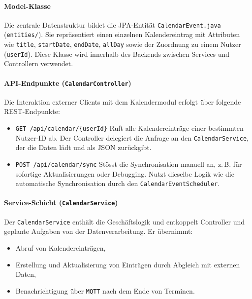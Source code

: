 \documentclass[12pt,a4paper]{report}
\begin{document}
\paragraph{Model-Klasse}
    Die zentrale Datenstruktur bildet die JPA-Entität \texttt{CalendarEvent.java} (\texttt{entities/}).
    Sie repräsentiert einen einzelnen Kalendereintrag mit Attributen wie \texttt{title}, \texttt{startDate}, \texttt{endDate}, \texttt{allDay} sowie der Zuordnung zu einem Nutzer (\texttt{userId}).
    Diese Klasse wird innerhalb des Backends zwischen Services und Controllern verwendet.

\paragraph{API-Endpunkte (\texttt{CalendarController})}
    Die Interaktion externer Clients mit dem Kalendermodul erfolgt über folgende REST-Endpunkte:
    \begin{itemize}
        \item \texttt{GET /api/calendar/\{userId\}}
            Ruft alle Kalendereinträge einer bestimmten Nutzer-ID ab.
            Der Controller delegiert die Anfrage an den \texttt{CalendarService}, der die Daten lädt und als JSON zurückgibt.
        \item \texttt{POST /api/calendar/sync}
            Stösst die Synchronisation manuell an, z.\,B. für sofortige Aktualisierungen oder Debugging.
            Nutzt dieselbe Logik wie die automatische Synchronisation durch den \texttt{CalendarEventScheduler}.
    \end{itemize}

\paragraph{Service-Schicht (\texttt{CalendarService})}
    Der \texttt{CalendarService} enthält die Geschäftslogik und entkoppelt Controller und geplante Aufgaben von der Datenverarbeitung.
    Er übernimmt:
    \begin{itemize}
        \item Abruf von Kalendereinträgen,
        \item Erstellung und Aktualisierung von Einträgen durch Abgleich mit externen Daten,
        \item Benachrichtigung über \texttt{MQTT} nach dem Ende von Terminen.
    \end{itemize}
\end{document}
